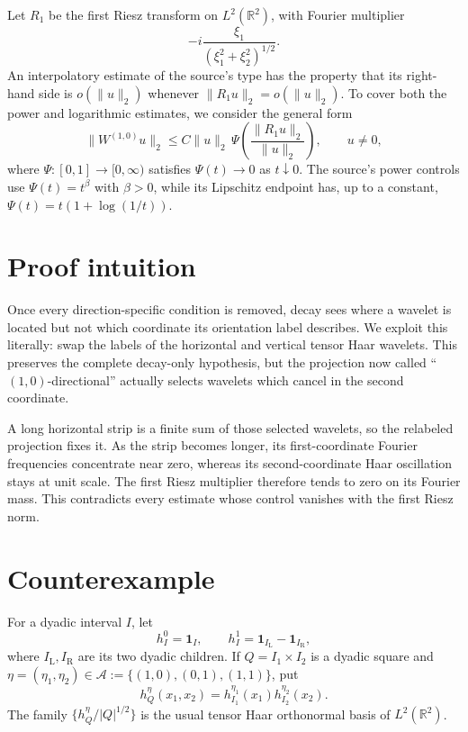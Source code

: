 \documentclass[11pt]{article}
\newcommand{\R}{\mathbb R}
\newcommand{\A}{\mathcal A}
\newcommand{\1}{\mathbf 1}
\begin{document}
Let $R_1$ be the first Riesz transform on $L^2(\R^2)$, with Fourier
multiplier
\[
 -i\frac{\xi_1}{(\xi_1^2+\xi_2^2)^{1/2}}.
\]
An interpolatory estimate of the source's type has the property that its
right-hand side is $o(\|u\|_2)$ whenever
$\|R_1u\|_2=o(\|u\|_2)$. To cover both the power and logarithmic estimates,
we consider the general form
\begin{equation}
 \|W^{(1,0)}u\|_2
 \leq C\|u\|_2\,
 \Psi\!\left(\frac{\|R_1u\|_2}{\|u\|_2}\right),
 \qquad u\ne0,
 \label{eq:generalestimate}
\end{equation}
where $\Psi:[0,1]\to[0,\infty)$ satisfies
$\Psi(t)\to0$ as $t\downarrow0$. The source's power controls use
$\Psi(t)=t^\beta$ with $\beta>0$, while its Lipschitz endpoint has, up to a
constant, $\Psi(t)=t(1+\log(1/t))$.

\section{Proof intuition}

Once every direction-specific condition is removed, decay sees where a
wavelet is located but not which coordinate its orientation label describes.
We exploit this literally: swap the labels of the horizontal and vertical
tensor Haar wavelets. This preserves the complete decay-only hypothesis, but
the projection now called ``$(1,0)$-directional'' actually selects wavelets
which cancel in the second coordinate.

A long horizontal strip is a finite sum of those selected wavelets, so the
relabeled projection fixes it. As the strip becomes longer, its first-coordinate
Fourier frequencies concentrate near zero, whereas its second-coordinate
Haar oscillation stays at unit scale. The first Riesz multiplier therefore
tends to zero on its Fourier mass. This contradicts every estimate whose
control vanishes with the first Riesz norm.

\section{Counterexample}

For a dyadic interval $I$, let
\[
 h_I^0=\1_I,
 \qquad h_I^1=\1_{I_{\mathrm L}}-\1_{I_{\mathrm R}},
\]
where $I_{\mathrm L},I_{\mathrm R}$ are its two dyadic children. If
$Q=I_1\times I_2$ is a dyadic square and
$\eta=(\eta_1,\eta_2)\in\A:=\{(1,0),(0,1),(1,1)\}$, put
\[
 h_Q^\eta(x_1,x_2)=h_{I_1}^{\eta_1}(x_1)
                     h_{I_2}^{\eta_2}(x_2).
\]
The family $\{h_Q^\eta/|Q|^{1/2}\}$ is the usual tensor Haar orthonormal
basis of $L^2(\R^2)$.
\end{document}
